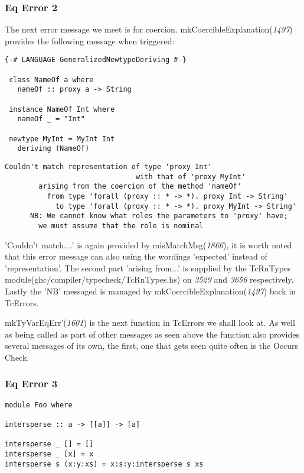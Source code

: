 \documentclass[a4paper]{article}
\begin{document}
\subsubsection{Eq Error 2}

The next error message we meet is for coercion. mkCoercibleExplanation(\textit{1497}) provides the following message when triggered: 

\begin{lstlisting}[label={lst: T8.0}, numbers=none, caption={Example Program \cite{ex8}}]
{-# LANGUAGE GeneralizedNewtypeDeriving #-}

 class NameOf a where
   nameOf :: proxy a -> String

 instance NameOf Int where
   nameOf _ = "Int"

 newtype MyInt = MyInt Int
   deriving (NameOf) 
\end{lstlisting}

\begin{lstlisting}[label={lst: T8.0.2}, numbers=none, caption={Error}]
Couldn't match representation of type 'proxy Int'
                               with that of 'proxy MyInt'
        arising from the coercion of the method 'nameOf'
          from type 'forall (proxy :: * -> *). proxy Int -> String'
            to type 'forall (proxy :: * -> *). proxy MyInt -> String'
      NB: We cannot know what roles the parameters to 'proxy' have;
        we must assume that the role is nominal
\end{lstlisting}

'Couldn't match....' is again provided by misMatchMsg(\textit{1866}), it is worth noted that this error message can also using the wordings 'expected' instead of 'representation'. The second part 'arising from...' is supplied by the TcRnTypes module(ghc/compiler/typecheck/TcRnTypes.hs) on \textit{3529} and \textit{3656} respectively. Lastly the 'NB' messaged is managed by mkCoercibleExplanation(\textit{1497}) back in TcErrors.

mkTyVarEqErr'(\textit{1601}) is the next function in TcErrors we shall look at. As well as being called as part of other messages as seen above the function also provides several messages of its own, the first, one that gets seen quite often is the Occurs Check.

\subsubsection{Eq Error 3}

\begin{lstlisting}[label={lst: T9.0}, numbers=none, caption={Example Program \cite{ex9}}]
module Foo where

intersperse :: a -> [[a]] -> [a]

intersperse _ [] = []
intersperse _ [x] = x
intersperse s (x:y:xs) = x:s:y:intersperse s xs
\end{lstlisting}
\end{document}
